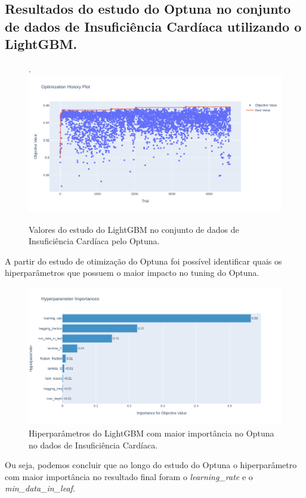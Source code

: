 \subsection{Resultados do estudo do Optuna no conjunto de dados de Insuficiência Cardíaca utilizando o LightGBM.}
\begin{figure}[H]
 \caption{Valores do estudo do LightGBM no conjunto de dados de Insuficiência Cardíaca pelo Optuna.}.
 \label{fig:op:heart:trials:lgbm}
 \centering
 \includegraphics[scale=0.4]{images/optuna_lgbm_heart.png}
\end{figure}
A partir do estudo de otimização do Optuna foi possível identificar quais os hiperparâmetros que possuem o maior impacto no tuning do Optuna.
\begin{figure}[H]
 \caption{Hiperparâmetros do LightGBM com maior importância no Optuna no dados de Insuficiência Cardíaca.}
 \label{fig:op:heart:impo:lgbm}
 \centering
 \includegraphics[scale=0.4]{images/optuna_lgbm_importance_heart.png}
\end{figure}
Ou seja, podemos concluir que ao longo do estudo do Optuna o hiperparâmetro com maior importância no resultado final foram o \textit{learning\_rate} e o \textit{min\_data\_in\_leaf}. 

